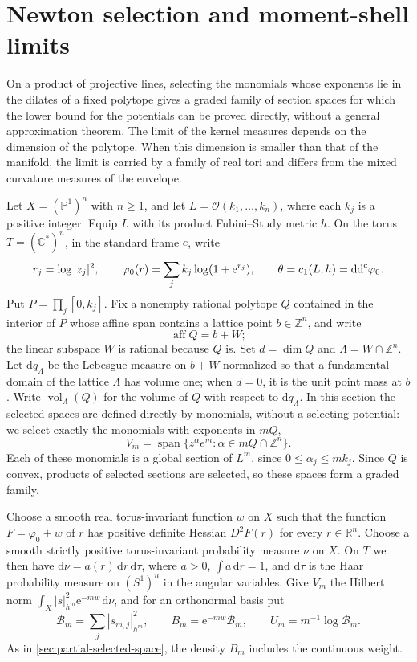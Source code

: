 \section{Newton selection and moment-shell limits}
\label{sec:newton-selected-kernels}

On a product of projective lines, selecting the monomials whose exponents lie in the dilates of a fixed polytope gives a graded family of section spaces for which the lower bound for the potentials can be proved directly, without a general approximation theorem. The limit of the kernel measures depends on the dimension of the polytope. When this dimension is smaller than that of the manifold, the limit is carried by a family of real tori and differs from the mixed curvature measures of the envelope.

Let $X=(\mathbb P^1)^n$ with $n\geq1$, and let
$L=\mathcal O(k_1,\ldots,k_n)$, where each $k_j$ is a positive integer.
Equip $L$ with its product Fubini--Study metric $h$. On the torus
$T=(\mathbb C^*)^n$, in the standard frame $e$, write
\[
 r_j=\log|z_j|^2,\qquad
 \varphi_0(r)=\sum_jk_j\log(1+\mathrm e^{r_j}),\qquad
 \theta=c_1(L,h)=\mathrm{dd}^{\mathrm{c}}\varphi_0.
\]
Put $P=\prod_j[0,k_j]$. Fix a nonempty rational polytope $Q$ contained in the interior of $P$ whose affine span contains a lattice point $b\in\mathbb Z^n$, and write
\[
 \operatorname{aff}Q=b+W;
\]
the linear subspace $W$ is rational because $Q$ is. Set $d=\dim Q$ and $\Lambda=W\cap\mathbb Z^n$. Let $\mathrm dq_\Lambda$ be the Lebesgue measure on $b+W$ normalized so that a fundamental domain of the lattice $\Lambda$ has volume one; when $d=0$, it is the unit point mass at $b$. Write $\operatorname{vol}_\Lambda(Q)$ for the volume of $Q$ with respect to $\mathrm dq_\Lambda$. In this section the selected spaces are defined directly by monomials, without a selecting potential: we select exactly the monomials with exponents in $mQ$,
\begin{equation}\label{eq:newton-selected-spaces}
 V_m=\operatorname{span}\{z^\alpha e^m:
                         \alpha\in mQ\cap\mathbb Z^n\}.
\end{equation}
Each of these monomials is a global section of $L^m$, since
$0\leq\alpha_j\leq mk_j$. Since $Q$ is convex, products of selected sections are selected, so these spaces form a graded family.

Choose a smooth real torus-invariant function $w$ on $X$ such that the function
$F=\varphi_0+w$ of $r$ has positive definite Hessian $D^2F(r)$ for every $r\in\mathbb R^n$.
Choose a smooth strictly positive torus-invariant probability measure $\nu$ on $X$. On $T$ we then have
$\mathrm d\nu=a(r)\,\mathrm dr\,\mathrm d\tau$, where $a>0$,
$\int a\,\mathrm dr=1$, and $\mathrm d\tau$ is the Haar probability measure on $(S^1)^n$ in the angular variables.
Give $V_m$ the Hilbert norm $\int_X|s|_{h^m}^2\mathrm e^{-mw}\,\mathrm d\nu$, and for an orthonormal basis put
\[
 \mathcal B_m=\sum_j|s_{m,j}|_{h^m}^2,\qquad
 B_m=\mathrm e^{-mw}\mathcal B_m,\qquad
 U_m=m^{-1}\log\mathcal B_m.
\]
As in \cref{sec:partial-selected-space}, the density $B_m$ includes the continuous weight.

